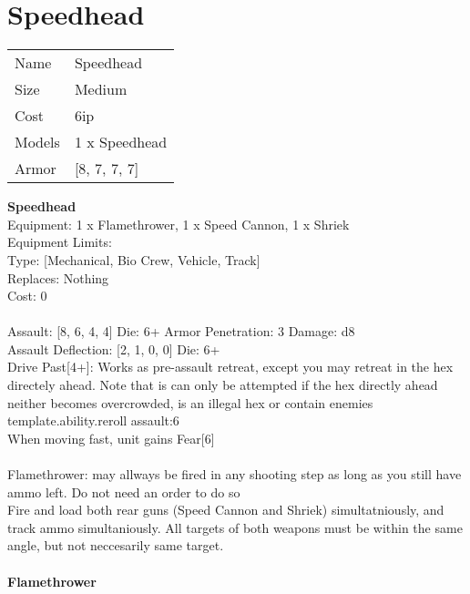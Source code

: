 \pagebreak\pagebreak

\section{ Speedhead }

\begin{tabular}{ll}
  Name & Speedhead \\
  Size & Medium\\
  Cost & 6ip\\
  Models & 1 x Speedhead\\
  Armor & [8, 7, 7, 7]\\
\end{tabular}

\noindent 

{\bf Speedhead } \\
Equipment: 1 x Flamethrower, 1 x Speed Cannon, 1 x Shriek \\
Equipment Limits:  \\
Type: [Mechanical, Bio Crew, Vehicle, Track] \\
Replaces: Nothing \\
Cost: 0\\
\ \\
Assault: [8, 6, 4, 4] Die: 6+ Armor Penetration: 3 Damage: d8 \\
Assault Deflection: [2, 1, 0, 0] Die: 6+\\
\indent Drive Past[4+]: Works as pre-assault retreat, except you may retreat in the hex directely ahead. Note that is can only be attempted if the hex directly ahead neither becomes overcrowded, is an illegal hex or contain enemies\\ 
{template.ability.reroll assault:6}\\ 
When moving fast, unit gains Fear[6]\\ 
 
\ \\
Flamethrower: may allways be fired in any shooting step as long as you still have ammo left. Do not need an order to do so\\ 
Fire and load both rear guns (Speed Cannon and Shriek) simultatniously, and track ammo simultaniously. All targets of both weapons must be within the same angle, but not neccesarily same target.\\ 

\ \\
{\bf Flamethrower } \\



